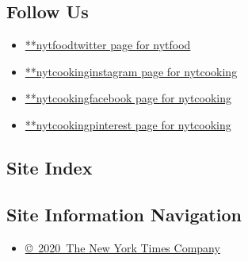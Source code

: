 \hypertarget{follow-us}{%
\subsection{Follow Us}\label{follow-us}}

\begin{itemize}
\tightlist
\item
  \href{https://twitter.com/nytfood}{**nytfoodtwitter page for nytfood}
\item
  \href{https://instagram.com/nytcooking}{**nytcookinginstagram page for
  nytcooking}
\item
  \href{https://www.facebookcorewwwi.onion/nytcooking}{**nytcookingfacebook
  page for nytcooking}
\item
  \href{https://pinterest.com/nytcooking}{**nytcookingpinterest page for
  nytcooking}
\end{itemize}

\hypertarget{site-index}{%
\subsection{Site Index}\label{site-index}}

\hypertarget{site-information-navigation}{%
\subsection{Site Information
Navigation}\label{site-information-navigation}}

\begin{itemize}
\tightlist
\item
  \href{https://help.nytimes3xbfgragh.onion/hc/en-us/articles/115014792127-Copyright-notice}{©~2020~The
  New York Times Company}
\end{itemize}

